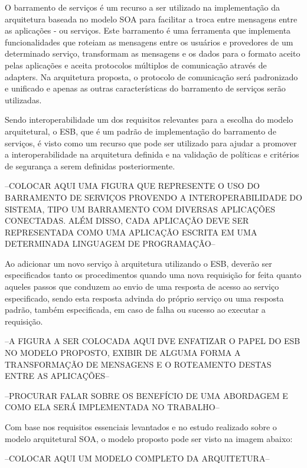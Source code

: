 O barramento de serviços é um recurso a ser utilizado na implementação da arquitetura baseada no modelo SOA para facilitar a troca entre mensagens entre as aplicações - ou serviços. Este barramento é uma ferramenta que implementa funcionalidades que roteiam as mensagens entre os usuários e provedores de um determinado serviço, transformam as mensagens e os dados para o formato aceito pelas aplicações e aceita protocolos múltiplos de comunicação através de adapters. Na arquitetura proposta, o protocolo de comunicação será padronizado e unificado e apenas as outras características do barramento de serviços serão utilizadas.

Sendo interoperabilidade um dos requisitos relevantes para a escolha do modelo arquitetural, o ESB, que é um padrão de implementação do barramento de serviços, é visto como um recurso que pode ser utilizado para ajudar a promover a interoperabilidade na arquitetura definida e na validação de políticas e critérios de segurança a serem definidas posteriormente.

--COLOCAR AQUI UMA FIGURA QUE REPRESENTE O USO DO BARRAMENTO DE SERVIÇOS PROVENDO A INTEROPERABILIDADE DO SISTEMA, TIPO UM BARRAMENTO COM DIVERSAS APLICAÇÕES CONECTADAS. 
ALÉM DISSO, CADA APLICAÇÃO DEVE SER REPRESENTADA COMO UMA APLICAÇÃO ESCRITA EM UMA DETERMINADA LINGUAGEM DE PROGRAMAÇÃO--


Ao adicionar um novo serviço à arquitetura utilizando o ESB, deverão ser especificados tanto os procedimentos quando uma nova requisição for feita quanto aqueles passos que conduzem ao envio de uma resposta de acesso ao serviço especificado, sendo esta resposta advinda do próprio serviço ou uma resposta padrão, também especificada, em caso de falha ou sucesso ao executar a requisição.


--A FIGURA A SER COLOCADA AQUI DVE ENFATIZAR O PAPEL DO ESB NO MODELO PROPOSTO, EXIBIR DE ALGUMA FORMA A TRANSFORMAÇÃO DE MENSAGENS E O ROTEAMENTO DESTAS ENTRE AS APLICAÇÕES--


--PROCURAR FALAR SOBRE OS BENEFÍCIO DE UMA ABORDAGEM E COMO ELA SERÁ IMPLEMENTADA NO TRABALHO--


Com base nos requisitos essenciais levantados e no estudo realizado sobre o modelo arquitetural SOA, o modelo proposto pode ser visto na imagem abaixo:

--COLOCAR AQUI UM MODELO COMPLETO DA ARQUITETURA--



